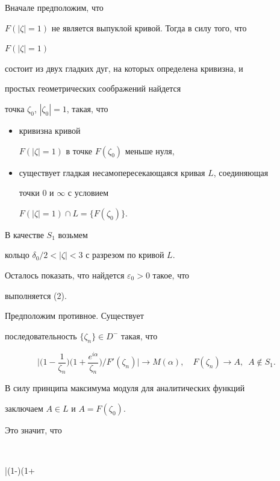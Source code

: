 \begin{pf} Вначале предположим, что


$F(|\zeta|=1)$ не является выпуклой кривой. Тогда в силу того, что


$F(|\zeta|=1)$


состоит из двух гладких дуг, на которых определена кривизна, и


простых геометрических соображений найдется


точка $\zeta_0$,  $|\zeta_0|=1$, такая, что


\begin{itemize}


\item[1)] кривизна кривой


$F(|\zeta|=1)$ в точке $F(\zeta_0)$ меньше нуля,


\item[2)] существует гладкая несамопересекающаяся кривая $L$, соединяющая


точки $0$ и $\infty$ с условием


$F(|\zeta|=1) \cap L = \{ F(\zeta_0) \}$.


\end{itemize}


В качестве $S_1$  возьмем


кольцо $\delta_0/2 < |\zeta| < 3$ с разрезом по кривой $L$.


Осталось показать, что найдется $\varepsilon_0 > 0 $ такое, что


выполняется (2).





Предположим противное. Существует


последовательность $\{ \zeta_n \} \in D^-$ такая, что


$$


\bigg|\bigg(1-\frac{1}{\zeta_n}\bigg)\bigg(1+


\frac{e^{i\alpha}}{\zeta_n}\bigg)/


F'(\zeta_n)\bigg| \to M(\alpha), \quad F(\zeta_n) \to A,\; \ A \notin S_1.


$$


В силу принципа максимума модуля для аналитических функций


заключаем $A \in L$ и $A=F(\zeta_0)$.


Это значит, что


$$


\bigg|\bigg(1-\bigg)\bigg(1+



\end{pf}
